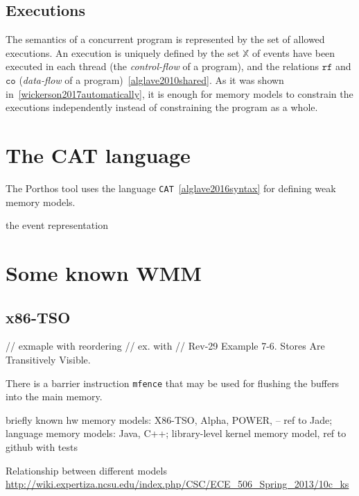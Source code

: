 \subsection{Executions}
\label{ch:wmm:model:executions}

The semantics of a concurrent program is represented by the set of allowed executions.
An execution is uniquely defined by the set $\mathbb{X}$ of events have been executed in each thread (the \textit{control-flow} of a program), and the relations $\mathtt{rf}$ and $\mathtt{co}$ (\textit{data-flow} of a program)~\ref{alglave2010shared}. As it was shown in~\ref{wickerson2017automatically}, it is enough for memory models to constrain the executions independently instead of constraining the program as a whole.

\section{The CAT language}

The Porthos tool uses the language \texttt{CAT}~\ref{alglave2016syntax} for defining weak memory models.

the event representation

\section{Some known WMM}

\subsection{x86-TSO}
\label{ch:wmm:x86}
// exmaple with reordering
// ex. with 
// Rev-29 Example 7-6. Stores Are Transitively Visible. %

There is a barrier instruction \texttt{mfence} that may be used for flushing the buffers into the main memory.

briefly known hw memory models: X86-TSO, Alpha, POWER, -- ref to Jade;
language memory models: Java, C++;
library-level kernel memory model, ref to github with tests

Relationship between different models \url{http://wiki.expertiza.ncsu.edu/index.php/CSC/ECE_506_Spring_2013/10c_ks}
